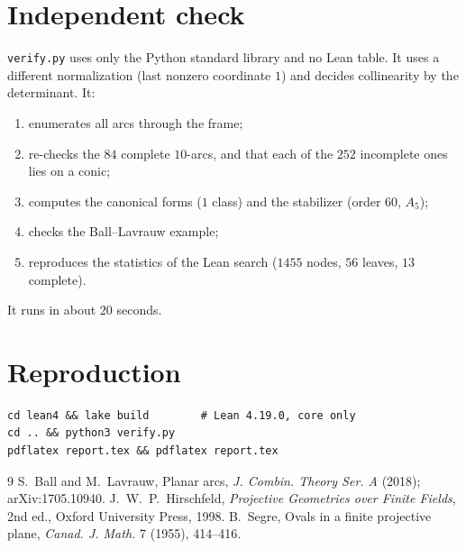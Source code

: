 \documentclass[11pt]{article}
\theoremstyle{definition}
\theoremstyle{remark}
\begin{document}
\section{Independent check}
\texttt{verify.py} uses only the Python standard library and no Lean table. It
uses a different normalization (last nonzero coordinate $1$) and decides
collinearity by the determinant. It:
\begin{enumerate}
\item enumerates all arcs through the frame;
\item re-checks the $84$ complete $10$-arcs, and that each of the $252$
incomplete ones lies on a conic;
\item computes the canonical forms ($1$ class) and the stabilizer (order $60$,
$A_5$);
\item checks the Ball--Lavrauw example;
\item reproduces the statistics of the Lean search ($1455$ nodes, $56$ leaves,
$13$ complete).
\end{enumerate}
It runs in about $20$ seconds.

\section{Reproduction}
\begin{verbatim}
cd lean4 && lake build        # Lean 4.19.0, core only
cd .. && python3 verify.py
pdflatex report.tex && pdflatex report.tex
\end{verbatim}

\begin{thebibliography}{9}
 S.~Ball and M.~Lavrauw, Planar arcs, \emph{J. Combin. Theory
Ser. A} (2018); arXiv:1705.10940.
 J.~W.~P.~Hirschfeld, \emph{Projective Geometries over Finite
Fields}, 2nd ed., Oxford University Press, 1998.
 B.~Segre, Ovals in a finite projective plane, \emph{Canad. J.
Math.} 7 (1955), 414--416.
\end{thebibliography}
\end{document}

